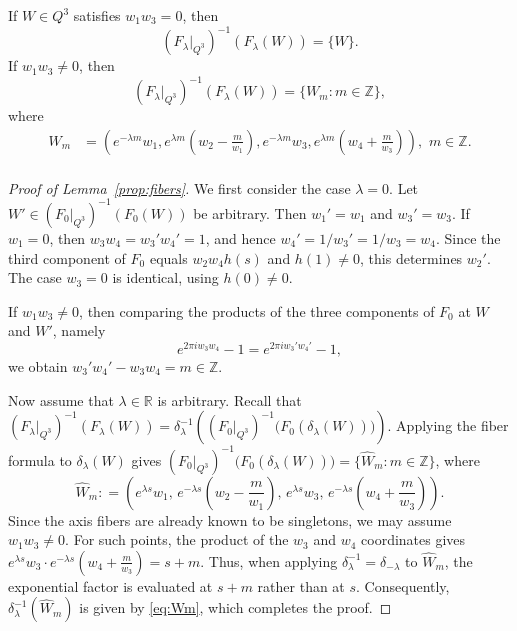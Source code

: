\documentclass[10pt,a4paper]{amsart}
\begin{document}
\begin{lemma}\label{prop:fibers}
If \(W\in Q^3\) satisfies \(w_1w_3=0\), then 
\begin{equation*}
(F_{\lambda}|_{Q^3})^{-1}(F_{\lambda}(W))=\{W\}.    
\end{equation*}
If $w_1w_3\neq0$, then \begin{equation*}
(F_{\lambda}|_{Q^3})^{-1}(F_{\lambda}(W))=\{W_m:m\in\mathbb Z\},    
\end{equation*} where
\begin{equation}\label{eq:Wm}
\begin{split}
W_m&=\left(e^{-\lambda m}w_1,
 e^{\lambda m}(w_2-\frac{m}{w_1}),
 e^{-\lambda m}w_3,
 e^{\lambda m}(w_4+\frac{m}{w_3})\right),\,\,m\in\mathbb Z.\\
\end{split}
\end{equation}
\end{lemma}

\begin{proof}[Proof of Lemma~\ref{prop:fibers}]
We first consider the case $\lambda=0$. Let $W'\in (F_0|_{Q^3})^{-1}(F_0(W))$ be arbitrary. Then $w_1'=w_1$ and $w_3'=w_3$. If $w_1=0$, then $w_3w_4=w_3'w_4'=1$, and hence $w_4'=1/w_3'=1/w_3=w_4$. Since the third component of $F_0$ equals $w_2 w_4 h(s)$ and $h(1)\neq0$, this determines $w_2'$. The case $w_3=0$ is identical, using $h(0)\neq0$.

If $w_1w_3\neq0$, then comparing the products of the three components of $F_0$ at $W$ and $W'$, namely 
\begin{equation*}%
e^{2\pi iw_3w_4}-1=e^{2\pi iw_3'w_4'}-1,
\end{equation*}
we obtain $w_3'w_4'-w_3w_4=m\in\mathbb Z$. 

Now assume that $\lambda\in\mathbb R$ is arbitrary. Recall that $(F_{\lambda}|_{Q^3})^{-1}(F_{\lambda}(W))=\delta_{\lambda}^{-1}\left( (F_0|_{Q^3})^{-1}\bigl(F_0(\delta_{\lambda}(W))\bigr)\right)$. Applying the fiber formula to $\delta_{\lambda}(W)$ gives
$(F_0|_{Q^3})^{-1}\bigl(F_0(\delta_{\lambda}(W))\bigr) = \{\widehat W_m:m\in\mathbb Z\}$,
where
\[
 \widehat W_m:
 =
 \left(
 e^{\lambda s}w_1,\,
 e^{-\lambda s}(w_2-\frac{m}{w_1}),\,
 e^{\lambda s}w_3,\,
 e^{-\lambda s}(w_4+\frac{m}{w_3})
 \right).
\]
Since the axis fibers are already known to be singletons, we may assume \(w_1w_3\neq0\). For such points, the product of the $w_3$ and $w_4$ coordinates gives $e^{\lambda s}w_3\cdot e^{-\lambda s}(w_4+\frac{m}{w_3})=s+m$. Thus, when applying \(\delta_{\lambda}^{-1}=\delta_{-\lambda}\) to \(\widehat W_m\), the exponential factor is evaluated at \(s+m\) rather than at \(s\). Consequently, \(\delta_{\lambda}^{-1}(\widehat W_m)\) is given by \eqref{eq:Wm}, which completes the proof.
\end{proof}
\end{document}
